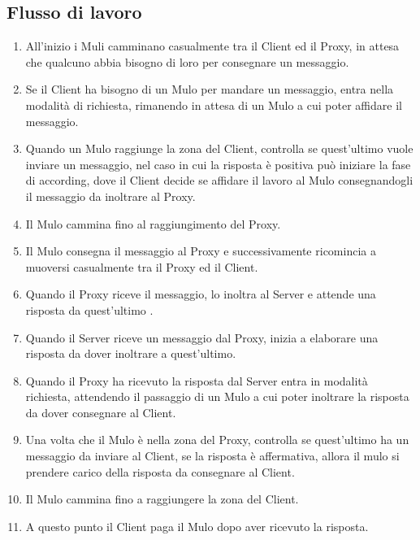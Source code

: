\documentclass[13pt,a4paper]{article}
\begin{document}
	\subsection{Flusso di lavoro}
	\begin{enumerate}
		\item All'inizio i Muli camminano casualmente tra il Client ed il Proxy, in attesa che qualcuno abbia bisogno di loro per consegnare un messaggio.
		\item Se il Client ha bisogno di un Mulo per mandare un messaggio, entra nella modalità di richiesta, rimanendo in attesa di un Mulo a cui poter affidare il messaggio.
		\item Quando un Mulo raggiunge la zona del Client, controlla se quest'ultimo vuole inviare un messaggio, nel caso in cui la risposta è positiva può iniziare la fase di according, dove il Client decide se affidare il lavoro al Mulo consegnandogli il messaggio da inoltrare al Proxy.
		\item Il Mulo cammina  fino al raggiungimento del Proxy.
		\item Il Mulo consegna il messaggio al Proxy e successivamente ricomincia a muoversi casualmente tra il Proxy ed il Client.
		\item Quando il Proxy riceve il messaggio, lo inoltra al Server e attende una risposta da quest'ultimo .
		\item Quando il Server riceve un messaggio dal Proxy, inizia a elaborare una risposta da dover inoltrare a quest'ultimo.
		\item Quando il Proxy ha ricevuto la risposta dal Server entra in modalità richiesta, attendendo il passaggio  di un Mulo a cui poter inoltrare la risposta da dover consegnare al Client. 
		\item Una volta che il Mulo è nella zona del Proxy, controlla se quest'ultimo ha un messaggio da inviare al Client, se la risposta è affermativa, allora il mulo si prendere carico della risposta da consegnare al Client. 
		\item Il Mulo cammina fino a raggiungere la zona del Client. 
		\item A questo punto il Client paga il Mulo dopo aver ricevuto la risposta.
	\end{enumerate}
	
\end{document}

